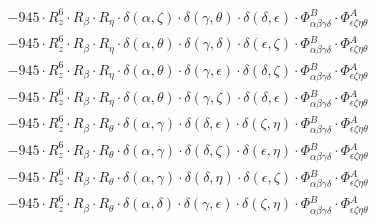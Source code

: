 \documentclass{article}
\begin{document}
\begin{equation}
\begin{array}{c}
 \\[0.2em] 		 - 945 \cdot R_{z}^{6} \cdot R_{\beta{}} \cdot R_{\eta{}} \cdot \delta{}\left(\alpha{}, \zeta{}\right) \cdot \delta{}\left(\gamma{}, \theta{}\right) \cdot \delta{}\left(\delta{}, \epsilon{}\right) \cdot \Phi{}^{B}_{\alpha{}\beta{}\gamma{}\delta{}} \cdot \Phi{}^{A}_{\epsilon{}\zeta{}\eta{}\theta{}} 
 \\[0.2em] 		 - 945 \cdot R_{z}^{6} \cdot R_{\beta{}} \cdot R_{\eta{}} \cdot \delta{}\left(\alpha{}, \theta{}\right) \cdot \delta{}\left(\gamma{}, \delta{}\right) \cdot \delta{}\left(\epsilon{}, \zeta{}\right) \cdot \Phi{}^{B}_{\alpha{}\beta{}\gamma{}\delta{}} \cdot \Phi{}^{A}_{\epsilon{}\zeta{}\eta{}\theta{}} 
 \\[0.2em] 		 - 945 \cdot R_{z}^{6} \cdot R_{\beta{}} \cdot R_{\eta{}} \cdot \delta{}\left(\alpha{}, \theta{}\right) \cdot \delta{}\left(\gamma{}, \epsilon{}\right) \cdot \delta{}\left(\delta{}, \zeta{}\right) \cdot \Phi{}^{B}_{\alpha{}\beta{}\gamma{}\delta{}} \cdot \Phi{}^{A}_{\epsilon{}\zeta{}\eta{}\theta{}} 
 \\[0.2em] 		 - 945 \cdot R_{z}^{6} \cdot R_{\beta{}} \cdot R_{\eta{}} \cdot \delta{}\left(\alpha{}, \theta{}\right) \cdot \delta{}\left(\gamma{}, \zeta{}\right) \cdot \delta{}\left(\delta{}, \epsilon{}\right) \cdot \Phi{}^{B}_{\alpha{}\beta{}\gamma{}\delta{}} \cdot \Phi{}^{A}_{\epsilon{}\zeta{}\eta{}\theta{}} 
 \\[0.2em] 		 - 945 \cdot R_{z}^{6} \cdot R_{\beta{}} \cdot R_{\theta{}} \cdot \delta{}\left(\alpha{}, \gamma{}\right) \cdot \delta{}\left(\delta{}, \epsilon{}\right) \cdot \delta{}\left(\zeta{}, \eta{}\right) \cdot \Phi{}^{B}_{\alpha{}\beta{}\gamma{}\delta{}} \cdot \Phi{}^{A}_{\epsilon{}\zeta{}\eta{}\theta{}} 
 \\[0.2em] 		 - 945 \cdot R_{z}^{6} \cdot R_{\beta{}} \cdot R_{\theta{}} \cdot \delta{}\left(\alpha{}, \gamma{}\right) \cdot \delta{}\left(\delta{}, \zeta{}\right) \cdot \delta{}\left(\epsilon{}, \eta{}\right) \cdot \Phi{}^{B}_{\alpha{}\beta{}\gamma{}\delta{}} \cdot \Phi{}^{A}_{\epsilon{}\zeta{}\eta{}\theta{}} 
 \\[0.2em] 		 - 945 \cdot R_{z}^{6} \cdot R_{\beta{}} \cdot R_{\theta{}} \cdot \delta{}\left(\alpha{}, \gamma{}\right) \cdot \delta{}\left(\delta{}, \eta{}\right) \cdot \delta{}\left(\epsilon{}, \zeta{}\right) \cdot \Phi{}^{B}_{\alpha{}\beta{}\gamma{}\delta{}} \cdot \Phi{}^{A}_{\epsilon{}\zeta{}\eta{}\theta{}} 
 \\[0.2em] 		 - 945 \cdot R_{z}^{6} \cdot R_{\beta{}} \cdot R_{\theta{}} \cdot \delta{}\left(\alpha{}, \delta{}\right) \cdot \delta{}\left(\gamma{}, \epsilon{}\right) \cdot \delta{}\left(\zeta{}, \eta{}\right) \cdot \Phi{}^{B}_{\alpha{}\beta{}\gamma{}\delta{}} \cdot \Phi{}^{A}_{\epsilon{}\zeta{}\eta{}\theta{}} 

\end{array}
\end{equation}
\end{document}
